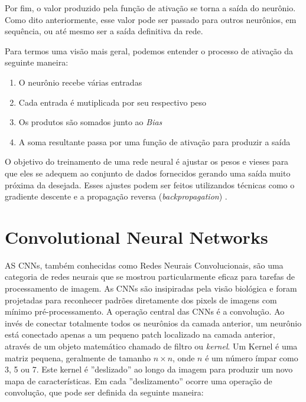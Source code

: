 Por fim, o valor produzido pela função de ativação se torna a saída do neurônio. Como dito anteriormente, esse valor pode ser passado para outros neurônios, em sequência, ou até mesmo ser a saída definitiva da rede.

Para termos uma visão mais geral, podemos entender o processo de ativação da seguinte maneira:

\begin{enumerate}
    \item O neurônio recebe várias entradas
    \item Cada entrada é mutiplicada por seu respectivo peso
    \item Os produtos são somados junto ao \textit{Bias}
    \item A soma resultante passa por uma função de ativação para produzir a saída
\end{enumerate}

O objetivo do treinamento de uma rede neural é ajustar os pesos e vieses para que eles se adequem ao conjunto de dados fornecidos gerando uma saída muito próxima da desejada. Esses ajustes podem ser feitos utilizandos técnicas como o gradiente descente e a propagação reversa (\textit{backpropagation}) \cite{58337} \cite{Watt2016MachineLearning}.   



\section{Convolutional Neural Networks}

AS CNNs, também conhecidas como Redes Neurais Convolucionais, são uma categoria de redes neurais que se mostrou particularmente eficaz para tarefas de processamento de imagem. As CNNs são insipiradas pela visão biológica e foram projetadas para reconhecer padrões diretamente dos pixels de imagens com mínimo pré-processamento. A operação central das CNNs é a convolução. Ao invés de conectar totalmente todos os neurônios da camada anterior, um neurônio está conectado apenas a um pequeno patch localizado na camada anterior, através de um objeto matemático chamado de filtro ou \textit{kernel}. Um Kernel é uma matriz pequena, geralmente de tamanho $n \times n$, onde $n$ é um número ímpar como 3, 5 ou 7. Este kernel é ''deslizado'' ao longo da imagem para produzir um novo mapa de características.\cite{GoodfellowBengioCourville2016} Em cada ''deslizamento'' ocorre uma operação de convolução, que pode ser definida da seguinte maneira: 

